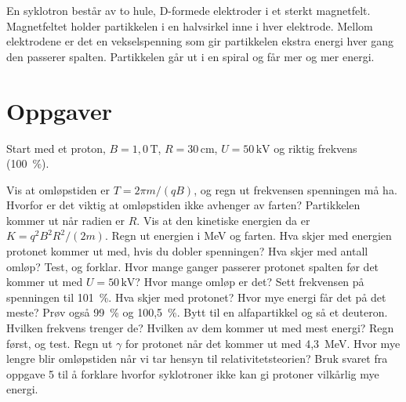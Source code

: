 \documentclass[11pt]{article}
\begin{document}

En syklotron består av to hule, D-formede elektroder i et sterkt magnetfelt. Magnetfeltet holder partikkelen i en halvsirkel inne i hver elektrode. Mellom elektrodene er det en vekselspenning som gir partikkelen ekstra energi hver gang den passerer spalten. Partikkelen går ut i en spiral og får mer og mer energi.

\section*{Oppgaver}

Start med et proton, $B = 1{,}0\,\mathrm{T}$, $R = 30\,\mathrm{cm}$, $U = 50\,\mathrm{kV}$ og riktig frekvens (100~\%).

\begin{oppgaveliste}
\oppgave {}Vis at omløpstiden er $T = 2πm/(qB)$, og regn ut frekvensen spenningen må ha. Hvorfor er det viktig at omløpstiden ikke avhenger av farten?
\svar
\oppgave {}Partikkelen kommer ut når radien er $R$. Vis at den kinetiske energien da er $K = q^{2}B^{2}R^{2}/(2m)$. Regn ut energien i MeV og farten.
\svar
\oppgave {}Hva skjer med energien protonet kommer ut med, hvis du dobler spenningen? Hva skjer med antall omløp? Test, og forklar.
\svar
\oppgave {}Hvor mange ganger passerer protonet spalten før det kommer ut med $U = 50\,\mathrm{kV}$? Hvor mange omløp er det?
\svar
\oppgave {}Sett frekvensen på spenningen til 101~\%. Hva skjer med protonet? Hvor mye energi får det på det meste? Prøv også 99~\% og 100,5~\%.
\svar
\oppgave {}Bytt til en alfapartikkel og så et deuteron. Hvilken frekvens trenger de? Hvilken av dem kommer ut med mest energi? Regn først, og test.
\svar
\oppgave {}Regn ut $γ$ for protonet når det kommer ut med 4,3~MeV. Hvor mye lengre blir omløpstiden når vi tar hensyn til relativitetsteorien? Bruk svaret fra oppgave 5 til å forklare hvorfor syklotroner ikke kan gi protoner vilkårlig mye energi.
\svar
\end{oppgaveliste}
\end{document}
